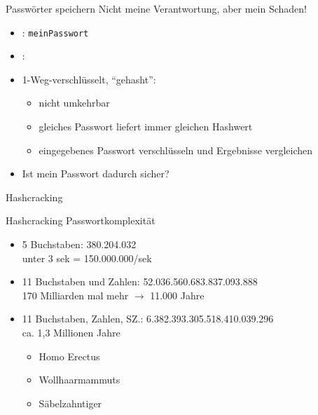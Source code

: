 \begin{frame}{Passwörter speichern} 
  Nicht meine Verantwortung, aber mein Schaden!
  \begin{itemize}
    \item<2-> : \hfill{\tiny{\texttt{meinPasswort}}}
    \item<4-> : 
    \item<7-> 1-Weg-verschlüsselt, ``gehasht'': \\
    \begin{itemize}
      \item<9->nicht umkehrbar
      \item<9->gleiches Passwort liefert immer gleichen Hashwert
      \item<10->eingegebenes Passwort verschlüsseln und Ergebnisse vergleichen
    \end{itemize}
    \item<11->Ist mein Passwort dadurch sicher?
  \end{itemize}
\end{frame}


\begin{frame}[c]{Hashcracking}

    \begin{center}
    \end{center}
\end{frame}

\begin{frame}{Hashcracking}
    Passwortkomplexität
    \begin{itemize}
      \item<1-> 5 Buchstaben: 						  \hfill{380.204.032}\\
	    { unter 3 sek = 150.000.000/sek}
      \item<2-> 11 Buchstaben und Zahlen: 			   \hfill{52.036.560.683.837.093.888}\\
	    { 170 Milliarden mal mehr $\rightarrow$ 11.000 Jahre}
      \item<3-> 11 Buchstaben, Zahlen, SZ.: 		\hfill{6.382.393.305.518.410.039.296}\\
	    { ca. 1,3 Millionen Jahre}\\
	\begin{itemize}
	  \item<4-> Homo Erectus
	  \item<4-> Wollhaarmammuts
	  \item<4-> Säbelzahntiger
	\end{itemize}

    \end{itemize}
\end{frame}

